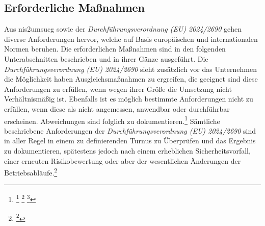 \documentclass[11pt,a4paper,hidelinks]{article}   %
\begin{document}
        \subsection{Erforderliche Maßnahmen}
            Aus \gls{nis2umsucg} sowie der \emph{Durchführungsverordnung (EU) 2024/2690} gehen diverse Anforderungen hervor, welche auf Basis europäischen und internationalen Normen beruhen. Die erforderlichen Maßnahmen sind in den folgenden Unterabschnitten beschrieben und in ihrer Gänze ausgeführt. Die \emph{Durchführungsverordnung (EU) 2024/2690} sieht zusätzlich vor das Unternehmen die Möglichkeit haben Ausgleichsmaßnahmen zu ergreifen, die geeignet sind diese Anforderungen zu erfüllen, wenn wegen ihrer Größe die Umsetzung nicht Verhältnismäßig ist. Ebenfalls ist es möglich bestimmte Anforderungen nicht zu erfüllen, wenn diese als nicht angemessen, anwendbar oder durchführbar erscheinen. Abweichungen sind folglich zu dokumentieren.\footnote{
                \footcite[Vgl. Absatz 3,][]{EU2024-2690}
                \footcite[Vgl. Absatz 5,][]{EU2024-2690}
                \footcite[Vgl. Absatz 6,][]{EU2024-2690}
            } Sämtliche beschriebene Anforderungen der \emph{Durchführungsverordnung (EU) 2024/2690} sind in aller Regel in einem zu definierenden Turnus zu Überprüfen und das Ergebnis zu dokumentieren, spätestens jedoch nach einem erheblichen Sicherheitsvorfall, einer erneuten Risikobewertung oder aber der wesentlichen  Änderungen  der  Betriebsabläufe.\footnote{
                \footcite[Vgl. 1.1.2., 1.2.6., 2.1.4. , 2.2.3., 2.3.4., 3.1.3., 3.2.7., 3.5.5., 3.6.3., 4.1.4. , 4.2.6. , 4.3.4., 5.1.6., 6.1.3., 6.2.4., 6.3.3., 6.4.4., 6.5.3., 6.7.3. , 6.8.3., 6.10.4. , 7.3., 8.2.5. , 9.3., 10.1.3., 10.2.3., 10.4.2., 11.1.3. , 11.2.3., 11.3.3. , 11.5.4., 11.6.4. , 12.1.3., 12.2.3. , 12.3.3. , 12.4.3. , 13.1.3. , 13.2.3. und 13.3.3.,][, Anhang]{EU2024-2690}
            }
            

\end{document}
